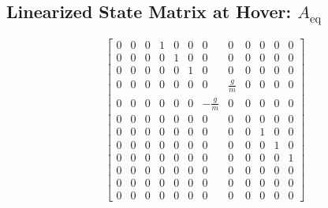 \documentclass{article}
\begin{document}
\subsection*{Linearized State Matrix at Hover: $A_{\text{eq}}$}
\[
\left[\begin{matrix}0 & 0 & 0 & 1 & 0 & 0 & 0 & 0 & 0 & 0 & 0 & 0\\0 & 0 & 0 & 0 & 1 & 0 & 0 & 0 & 0 & 0 & 0 & 0\\0 & 0 & 0 & 0 & 0 & 1 & 0 & 0 & 0 & 0 & 0 & 0\\0 & 0 & 0 & 0 & 0 & 0 & 0 & \frac{g}{m} & 0 & 0 & 0 & 0\\0 & 0 & 0 & 0 & 0 & 0 & - \frac{g}{m} & 0 & 0 & 0 & 0 & 0\\0 & 0 & 0 & 0 & 0 & 0 & 0 & 0 & 0 & 0 & 0 & 0\\0 & 0 & 0 & 0 & 0 & 0 & 0 & 0 & 0 & 1 & 0 & 0\\0 & 0 & 0 & 0 & 0 & 0 & 0 & 0 & 0 & 0 & 1 & 0\\0 & 0 & 0 & 0 & 0 & 0 & 0 & 0 & 0 & 0 & 0 & 1\\0 & 0 & 0 & 0 & 0 & 0 & 0 & 0 & 0 & 0 & 0 & 0\\0 & 0 & 0 & 0 & 0 & 0 & 0 & 0 & 0 & 0 & 0 & 0\\0 & 0 & 0 & 0 & 0 & 0 & 0 & 0 & 0 & 0 & 0 & 0\end{matrix}\right]
\]
\end{document}
